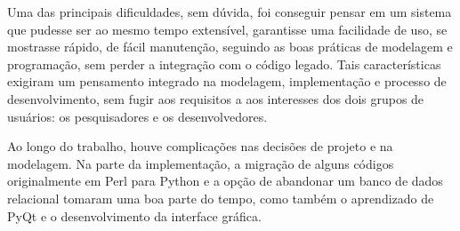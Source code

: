 Uma das principais dificuldades, sem dúvida, foi conseguir pensar em um sistema que pudesse ser ao mesmo tempo extensível, garantisse uma facilidade de uso,
se mostrasse rápido, de fácil manutenção, seguindo as boas práticas de modelagem e programação, sem perder a integração com o código legado. Tais
características exigiram um pensamento integrado na modelagem, implementação e processo de desenvolvimento, sem fugir aos requisitos a aos interesses dos dois
grupos de usuários: os pesquisadores e os desenvolvedores.

Ao longo do trabalho, houve complicações nas decisões de projeto e na modelagem. Na parte da implementação, a migração de alguns códigos originalmente em Perl
para Python e a opção de abandonar um banco de dados relacional tomaram uma boa parte do tempo, como também o aprendizado de PyQt e o desenvolvimento da
interface gráfica.